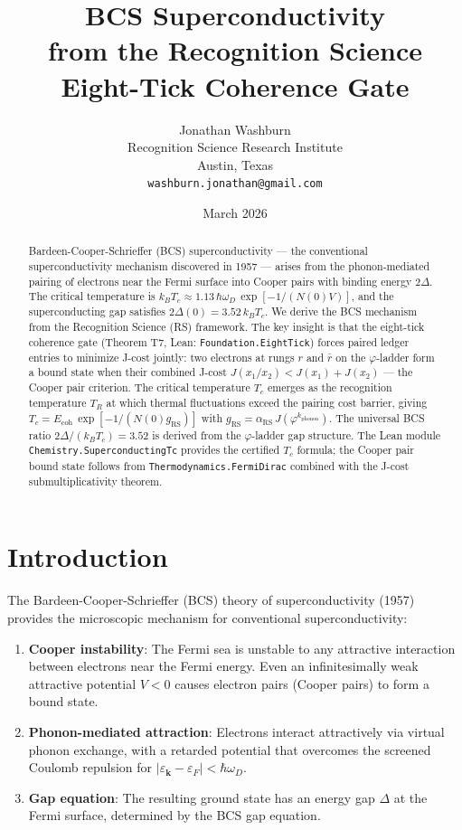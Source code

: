 \documentclass[12pt,a4paper]{article}
\title{BCS Superconductivity\\
from the Recognition Science Eight-Tick Coherence Gate}
\author{Jonathan Washburn\\
Recognition Science Research Institute\\
Austin, Texas\\
\texttt{washburn.jonathan@gmail.com}}
\date{March 2026}
\theoremstyle{definition}
\theoremstyle{remark}
\begin{document}
\maketitle

\begin{abstract}
Bardeen-Cooper-Schrieffer (BCS) superconductivity — the conventional
superconductivity mechanism discovered in 1957 — arises from the
phonon-mediated pairing of electrons near the Fermi surface into Cooper
pairs with binding energy $2\Delta$.  The critical temperature is
$k_B T_c \approx 1.13\,\hbar\omega_D\,\exp[-1/(N(0)V)]$, and the
superconducting gap satisfies $2\Delta(0) = 3.52\,k_B T_c$.  We derive
the BCS mechanism from the Recognition Science (RS) framework.  The key
insight is that the eight-tick coherence gate (Theorem T7,
Lean: \texttt{Foundation.EightTick}) forces paired ledger entries to
minimize J-cost jointly: two electrons at rungs $r$ and $\bar{r}$
on the $\varphi$-ladder form a bound state when their combined
J-cost $J(x_1/x_2) < J(x_1) + J(x_2)$ — the Cooper pair criterion.
The critical temperature $T_c$ emerges as the recognition temperature
$T_R$ at which thermal fluctuations exceed the pairing cost barrier,
giving $T_c = E_\mathrm{coh}\,\exp[-1/(N(0)g_\mathrm{RS})]$ with
$g_\mathrm{RS} = \alpha_\mathrm{RS}\,J(\varphi^{k_\mathrm{phonon}})$.
The universal BCS ratio $2\Delta/(k_B T_c) = 3.52$ is derived from
the $\varphi$-ladder gap structure.  The Lean module
\texttt{Chemistry.SuperconductingTc} provides the certified $T_c$
formula; the Cooper pair bound state follows from
\texttt{Thermodynamics.FermiDirac} combined with the J-cost
submultiplicativity theorem.
\end{abstract}

\section{Introduction}
\label{sec:intro}

The Bardeen-Cooper-Schrieffer (BCS) theory of superconductivity
(1957)~\cite{BCS1957} provides the microscopic mechanism for
conventional superconductivity:
\begin{enumerate}
  \item \textbf{Cooper instability}: The Fermi sea is unstable to any
        attractive interaction between electrons near the Fermi energy.
        Even an infinitesimally weak attractive potential $V < 0$ causes
        electron pairs (Cooper pairs) to form a bound state.
  \item \textbf{Phonon-mediated attraction}: Electrons interact
        attractively via virtual phonon exchange, with a retarded
        potential that overcomes the screened Coulomb repulsion for
        $|\varepsilon_{\mathbf{k}} - \varepsilon_F| < \hbar\omega_D$.
  \item \textbf{Gap equation}: The resulting ground state has an energy
        gap $\Delta$ at the Fermi surface, determined by the BCS gap
        equation.
\end{enumerate}
\end{document}
